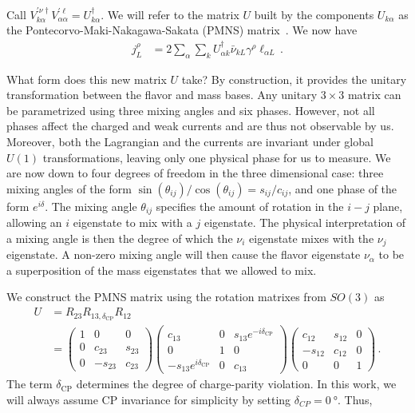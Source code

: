 Call $V^{\prime \nu \dagger}_{k \alpha}V^{\prime \ell}_{\alpha \alpha} = U^\dagger_{k \alpha}$. We will refer to the matrix $U$ built by the components $U_{k \alpha}$ as the
Pontecorvo-Maki-Nakagawa-Sakata (PMNS) matrix~\cite{pontecorvo1957,maki1962}. %
We now have 
\begin{align}\label{eq:j_CC3} %
    j^\rho_L &= 2 \sum_\alpha \sum_k U^\dagger_{\alpha k} \bar{\nu}_{k L} \gamma^\rho  \ell_{\alpha L}\,.
\end{align}

What form does this new matrix $U$ take? By construction, it provides the unitary transformation between the flavor and mass bases.
Any unitary $3\times3$ matrix can be parametrized using three mixing angles and six phases. However, not all phases affect the 
charged and weak currents and are thus not observable by us. Moreover, both the Lagrangian and the currents are invariant under global $U(1)$ transformations,
leaving only one physical phase for us to measure. We are now down to four degrees of freedom in the three dimensional case: three mixing angles
of the form $\sin{(\theta_{ij})}/\cos{(\theta_{ij})} = s_{ij}/c_{ij}$, and one phase of the form $e^{i\delta}$. The mixing angle $\theta_{ij}$ specifies 
the amount of rotation in the $i-j$ plane, allowing an $i$ eigenstate to mix with a $j$ eigenstate. The physical interpretation of
a mixing angle is then the degree of which the $\nu_i$ eigenstate mixes with the $\nu_j$ eigenstate. A non-zero mixing angle will then 
cause the flavor eigenstate $\nu_\alpha$ to be a superposition of the mass eigenstates that we allowed to mix. %

We construct the PMNS matrix using the rotation matrixes from $SO(3)$ as
\begin{align}\label{PMNS_def}
    U &= R_{23}R_{13,\delta_{\text{CP}}}R_{12} \nonumber \\
      & = 
    \begin{pmatrix}1 & 0 & 0 \\ 0 & c_{23} & s_{23} \\ 0 & -s_{23} & c_{23}\end{pmatrix}
\begin{pmatrix}c_{13} & 0 & s_{13} e^{-i \delta_{\mathrm{CP}}} \\ 0 & 1 & 0 \\ -s_{13} e^{i \delta_{\mathrm{CP}}} & 0 & c_{13}\end{pmatrix}
\begin{pmatrix}c_{12} & s_{12} & 0 \\ -s_{12} & c_{12} & 0 \\ 0 & 0 & 1\end{pmatrix}\,.
\end{align}
The term $\delta_\text{CP}$ determines the degree of charge-parity violation. In this work, we will always assume CP invariance for simplicity by
setting $\delta_{CP} = \SI{0}{\degree}$. Thus,

